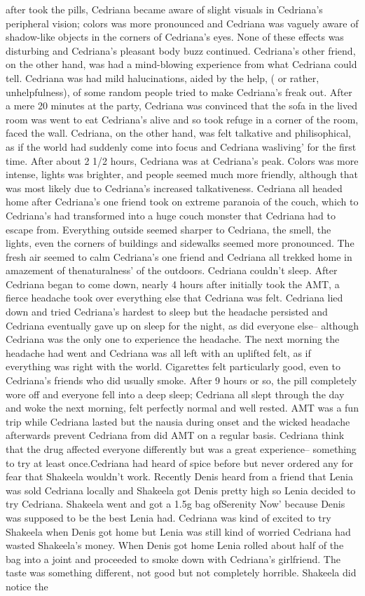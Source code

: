 \documentclass[12pt]{book}
\begin{document}
after took the pills, Cedriana became aware of slight visuals in Cedriana's peripheral vision; colors was more pronounced and Cedriana was vaguely aware of shadow-like objects in the corners of Cedriana's eyes. None of these effects was disturbing and Cedriana's pleasant body buzz continued. Cedriana's other friend, on the other hand, was had a mind-blowing experience from what Cedriana could tell. Cedriana was had mild halucinations, aided by the help, ( or rather, unhelpfulness), of some random people tried to make Cedriana's freak out. After a mere 20 minutes at the party, Cedriana was convinced that the sofa in the lived room was went to eat Cedriana's alive and so took refuge in a corner of the room, faced the wall. Cedriana, on the other hand, was felt talkative and philisophical, as if the world had suddenly come into focus and Cedriana wasliving' for the first time. After about 2 1/2 hours, Cedriana was at Cedriana's peak. Colors was more intense, lights was brighter, and people seemed much more friendly, although that was most likely due to Cedriana's increased talkativeness. Cedriana all headed home after Cedriana's one friend took on extreme paranoia of the couch, which to Cedriana's had transformed into a huge couch monster that Cedriana had to escape from. Everything outside seemed sharper to Cedriana, the smell, the lights, even the corners of buildings and sidewalks seemed more pronounced. The fresh air seemed to calm Cedriana's one friend and Cedriana all trekked home in amazement of thenaturalness' of the outdoors. Cedriana couldn't sleep. After Cedriana began to come down, nearly 4 hours after initially took the AMT, a fierce headache took over everything else that Cedriana was felt. Cedriana lied down and tried Cedriana's hardest to sleep but the headache persisted and Cedriana eventually gave up on sleep for the night, as did everyone else-- although Cedriana was the only one to experience the headache. The next morning the headache had went and Cedriana was all left with an uplifted felt, as if everything was right with the world. Cigarettes felt particularly good, even to Cedriana's friends who did usually smoke. After 9 hours or so, the pill completely wore off and everyone fell into a deep sleep; Cedriana all slept through the day and woke the next morning, felt perfectly normal and well rested. AMT was a fun trip while Cedriana lasted but the nausia during onset and the wicked headache afterwards prevent Cedriana from did AMT on a regular basis. Cedriana think that the drug affected everyone differently but was a great experience-- something to try at least once.Cedriana had heard of spice before but never ordered any for fear that Shakeela wouldn't work. Recently Denis heard from a friend that Lenia was sold Cedriana locally and Shakeela got Denis pretty high so Lenia decided to try Cedriana. Shakeela went and got a 1.5g bag ofSerenity Now' because Denis was supposed to be the best Lenia had. Cedriana was kind of excited to try Shakeela when Denis got home but Lenia was still kind of worried Cedriana had wasted Shakeela's money. When Denis got home Lenia rolled about half of the bag into a joint and proceeded to smoke down with Cedriana's girlfriend. The taste was something different, not good but not completely horrible. Shakeela did notice the 
\end{document}
